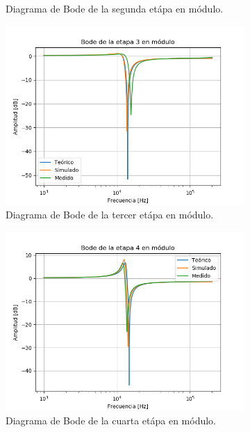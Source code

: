 \begin{figure}[H]
\begin{subfigure}{.49\textwidth}
	\caption{Diagrama de Bode de la segunda etápa en módulo.}
	\label{fig:mod2}
\end{subfigure}
\centering
\begin{subfigure}{.49\textwidth}
\centering
	\includegraphics[width=\textwidth]{Imagenes/Mod-3.png}
	\caption{Diagrama de Bode de la tercer etápa en módulo.}
	\label{fig:mod3}
\end{subfigure}
\centering
\begin{subfigure}{.49\textwidth}
\centering
	\includegraphics[width=\textwidth]{Imagenes/Mod-4.png}
	\caption{Diagrama de Bode de la cuarta etápa en módulo.}
	\label{fig:mod4}
\end{subfigure}
\centering
\begin{subfigure}{.49\textwidth}

\end{subfigure}
\end{figure}
